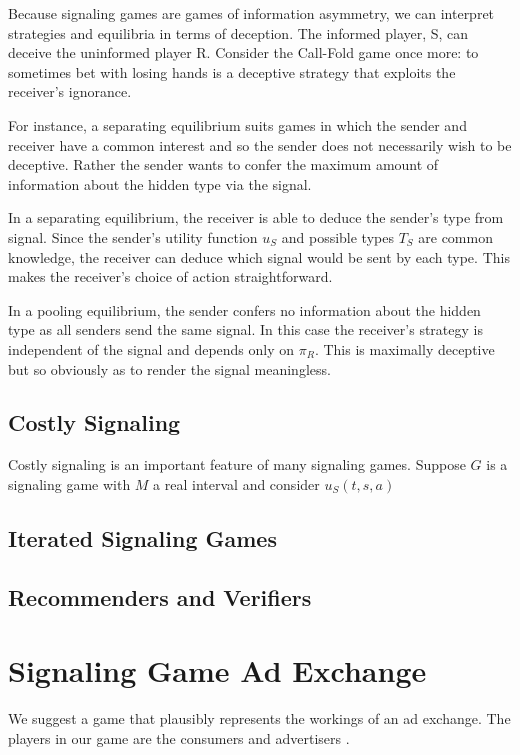 \documentclass{article}
\begin{document}
Because signaling games are games of information asymmetry, we can interpret strategies and equilibria in terms of deception. The informed player, S, can deceive the uninformed player R. Consider the Call-Fold game once more: to sometimes bet with losing hands is a deceptive strategy that exploits the receiver's ignorance. 

 For instance, a separating equilibrium suits games in which the sender and receiver have a common interest and so the sender does not necessarily wish to be deceptive. Rather the sender wants to confer the maximum amount of information about the hidden type via the signal.

In a separating equilibrium, the receiver is able to deduce the sender's type from signal. Since the sender's utility function $u_{S}$ and possible types $T_S$ are common knowledge, the receiver can deduce which signal would be sent by each type. This makes the receiver's choice of action straightforward.

In a pooling equilibrium, the sender confers no information about the hidden type as all senders send the same signal. In this case the receiver's strategy is independent of the signal and depends only on $\pi_{ R}$. This is maximally deceptive but so obviously as to render the signal meaningless.

\subsection{Costly Signaling}

Costly signaling is an important feature of many signaling games. Suppose $G$ is a signaling game with $M$ a real interval and consider $u_{S}(t,s,a)$ 

\subsection{Iterated Signaling Games}

\subsection{Recommenders and Verifiers}

\newpage

\section{Signaling Game Ad Exchange}

We suggest a game that plausibly represents the workings of an ad exchange. The players in our game are the consumers and advertisers . 
\end{document}
